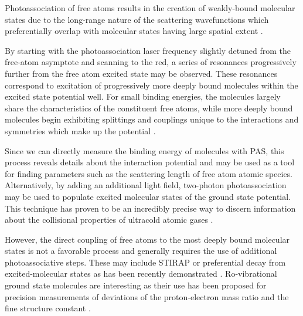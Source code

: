 Photoassociation of free atoms results in the creation of weakly-bound molecular states due to the long-range nature of the scattering wavefunctions which preferentially overlap with molecular states having large spatial extent \cite{Jones2006}.

By starting with the photoassociation laser frequency slightly detuned from the free-atom asymptote and scanning to the red, a series of resonances progressively further from the free atom excited state may be observed.
These resonances correspond to excitation of progressively more deeply bound molecules within the excited state potential well.
For small binding energies, the molecules largely share the characteristics of the constituent free atoms, while more deeply bound molecules begin exhibiting splittings and couplings unique to the interactions and symmetries which make up the potential \cite{Jones2006}.

Since we can directly measure the binding energy of molecules with PAS, this process reveals details about the interaction potential and may be used as a tool for finding parameters such as the scattering length of free atom atomic species.
Alternatively, by adding an additional light field, two-photon photoassociation may be used to populate excited molecular states of the ground state potential.
This technique has proven to be an incredibly precise way to discern information about the collisional properties of ultracold atomic gases \cite{MartinezDeEscobar2008, Aman2018}.

However, the direct coupling of free atoms to the most deeply bound molecular states is not a favorable process and generally requires the use of additional photoassociative steps.
These may include STIRAP or preferential decay from excited-molecular states as has been recently demonstrated \cite{Reinaudi2012, cbc17, Stellmer2012, Ciamei2017}.
Ro-vibrational ground state molecules are interesting as their use has been proposed for precision measurements of deviations of the proton-electron mass ratio \cite{zky08, Kotochigova2009} and the fine structure constant \cite{Beloy2011}. 

